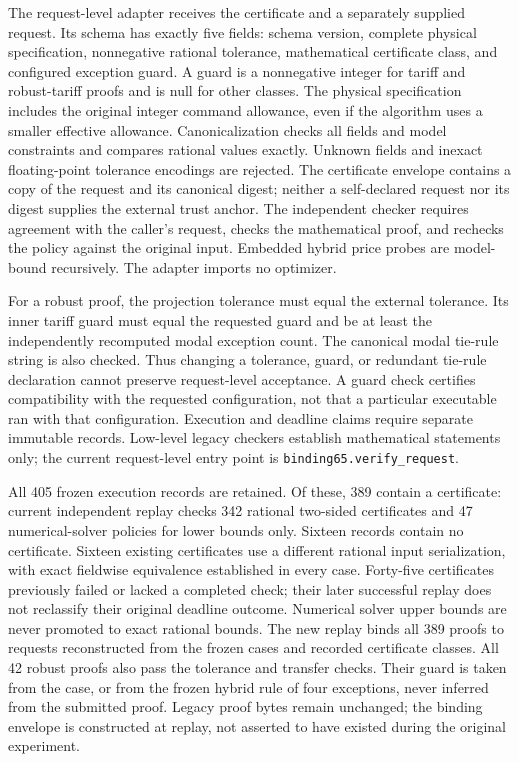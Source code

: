 \documentclass[11pt,letterpaper]{article}
\theoremstyle{definition}\newtheorem{remark}[theorem]{Remark}
\begin{document}
The request-level adapter receives the certificate and a separately supplied request. Its schema has exactly five fields: schema version, complete physical specification, nonnegative rational tolerance, mathematical certificate class, and configured exception guard. A guard is a nonnegative integer for tariff and robust-tariff proofs and is null for other classes. The physical specification includes the original integer command allowance, even if the algorithm uses a smaller effective allowance. Canonicalization checks all fields and model constraints and compares rational values exactly. Unknown fields and inexact floating-point tolerance encodings are rejected. The certificate envelope contains a copy of the request and its canonical digest; neither a self-declared request nor its digest supplies the external trust anchor. The independent checker requires agreement with the caller's request, checks the mathematical proof, and rechecks the policy against the original input. Embedded hybrid price probes are model-bound recursively. The adapter imports no optimizer.

For a robust proof, the projection tolerance must equal the external tolerance. Its inner tariff guard must equal the requested guard and be at least the independently recomputed modal exception count. The canonical modal tie-rule string is also checked. Thus changing a tolerance, guard, or redundant tie-rule declaration cannot preserve request-level acceptance. A guard check certifies compatibility with the requested configuration, not that a particular executable ran with that configuration. Execution and deadline claims require separate immutable records. Low-level legacy checkers establish mathematical statements only; the current request-level entry point is \texttt{binding65.verify\_request}.

All 405 frozen execution records are retained. Of these, 389 contain a certificate: current independent replay checks 342 rational two-sided certificates and 47 numerical-solver policies for lower bounds only. Sixteen records contain no certificate. Sixteen existing certificates use a different rational input serialization, with exact fieldwise equivalence established in every case. Forty-five certificates previously failed or lacked a completed check; their later successful replay does not reclassify their original deadline outcome. Numerical solver upper bounds are never promoted to exact rational bounds. The new replay binds all 389 proofs to requests reconstructed from the frozen cases and recorded certificate classes. All 42 robust proofs also pass the tolerance and transfer checks. Their guard is taken from the case, or from the frozen hybrid rule of four exceptions, never inferred from the submitted proof. Legacy proof bytes remain unchanged; the binding envelope is constructed at replay, not asserted to have existed during the original experiment.
\end{document}
